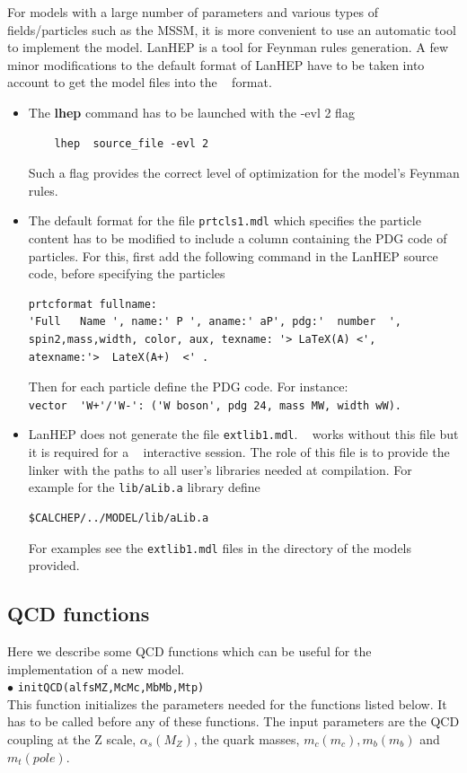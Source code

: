 \documentclass[12pt,a4paper]{article}
\begin{document}
For models with a large number of parameters and various types of fields/particles such as  the MSSM, it is more convenient to use an automatic tool to implement 
the model.  LanHEP is a  tool for Feynman  rules  generation. A few minor
modifications to the default format of LanHEP have to be taken into account to get the model files into
the \micro~ format. 
\begin{itemize}
\item  The {\bf lhep}  command has to be launched with the {-evl 2} flag  
\begin{verbatim}
    lhep  source_file -evl 2
\end{verbatim}
Such a flag provides the correct level of optimization for  the model's Feynman rules.

\item The default format for the file \verb|prtcls1.mdl| which specifies the particle content has to be
modified to include a column containing the PDG code of particles. 
For this, first add the following command in the LanHEP source code, before specifying the particles  
\begin{verbatim}
prtcformat fullname:
'Full   Name ', name:' P ', aname:' aP', pdg:'  number  ',
spin2,mass,width, color, aux, texname: '> LaTeX(A) <',
atexname:'>  LateX(A+)  <' .
\end{verbatim}

Then for each particle  define the PDG code. For
instance:\\
\verb|vector  'W+'/'W-': ('W boson', pdg 24, mass MW, width wW).|\\




\item LanHEP does not generate the  file \verb|extlib1.mdl|.
\micro~ works without  this file but it is required for a \calchep~ interactive session. 
The role of this file is to provide the linker with the paths to all user's libraries
needed at compilation. For example for the \verb|lib/aLib.a| library define
\begin{verbatim}
$CALCHEP/../MODEL/lib/aLib.a
\end{verbatim}
For  examples see the \verb|extlib1.mdl| files in the  directory of the models provided.  

\end{itemize}

\subsection{QCD functions}
Here we describe some QCD functions which can be useful for the implementation of a new model.\\
\noindent$\bullet$ \verb|initQCD(alfsMZ,McMc,MbMb,Mtp)|\\
This function initializes the parameters needed for the functions
listed below. It has to be called before any of these functions.
The input parameters are the QCD coupling at the Z scale,
$\alpha_s(M_Z)$, the quark masses, $m_c(m_c), m_b(m_b)$ and
$m_t(pole)$.
\end{document}
